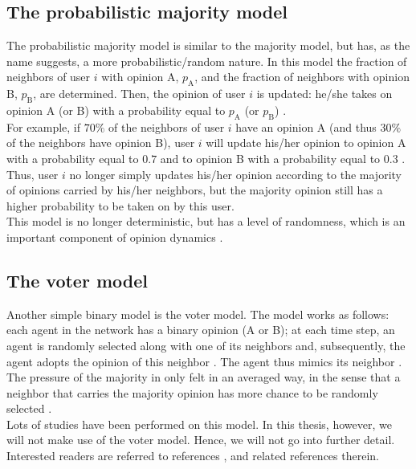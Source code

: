 \documentclass[11 pt , letterpaper , twoside , openright]{book}
\begin{document}
\subsection{The probabilistic majority model}\label{probMaj}

The probabilistic majority model is similar to the majority model, but has, as the name suggests, a more probabilistic/random nature. In this model the fraction of neighbors of user $i$ with opinion A, $p_\text{A}$, and the fraction of neighbors with opinion B, $p_\text{B}$, are determined. Then, the opinion of user $i$ is updated: he/she takes on opinion A (or B) with a probability equal to $p_\text{A}$ (or $p_\text{B}$) \cite{Perra2019}.\\
\newline
For example, if $70\%$ of the neighbors of user $i$ have an opinion A (and thus $30 \%$ of the neighbors have opinion B), user $i$ will update his/her opinion to opinion A with a probability equal to $0.7$ and to opinion B with a probability equal to $0.3$ \cite{Perra2019}. Thus, user $i$ no longer simply updates his/her opinion according to the majority of opinions carried by his/her neighbors, but the majority opinion still has a higher probability to be taken on by this user.\\
\newline
This model is no longer deterministic, but has a level of randomness, which is an important component of opinion dynamics \cite{Perra2019}. 

\subsection{The voter model}

Another simple binary model is the voter model. The model works as follows: each agent in the network has a binary opinion (A or B); at each time step, an agent is randomly selected along with one of its neighbors and, subsequently, the agent adopts the opinion of this neighbor \cite{Castellano2009}. The agent thus mimics its neighbor \cite{Castellano2009}. \\
\newline
The pressure of the majority in only felt in an averaged way, in the sense that a neighbor that carries the majority opinion has more chance to be randomly selected \cite{Castellano2009}.\\
\newline
Lots of studies have been performed on this model. In this thesis, however, we will not make use of the voter model. Hence, we will not go into further detail. Interested readers are referred to references \cite{Castellano2009}, \cite{Fernandez2014} and related references therein.
\end{document}
